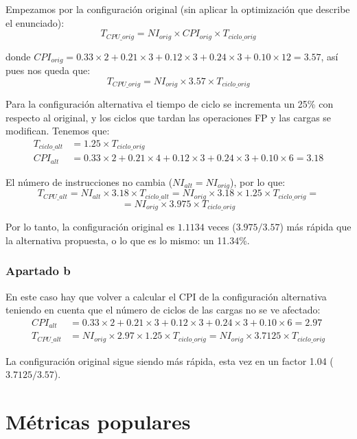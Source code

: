 \documentclass[12pt,onecolumn]{memoir}
\newenvironment{ejercicio}{%
    \def\FrameCommand{\fboxrule=\FrameRule\fboxsep=\FrameSep \fcolorbox{black}{metallic-green}}%
    \MakeFramed {\FrameRestore}}%
{\endMakeFramed}
\begin{document}
\begin{ejercicio}
Empezamos por la configuración original (sin aplicar la optimización que describe el enunciado):
\[ T_{CPU\_orig} = NI_{orig} \times CPI_{orig} \times T_{ciclo\_orig} \]

donde $CPI_{orig} = 0.33 \times 2 + 0.21 \times 3 + 0.12 \times 3 + 0.24 \times 3 + 0.10 \times 12 = 3.57$, así pues nos queda que:
\[ T_{CPU\_orig} = NI_{orig} \times 3.57 \times T_{ciclo\_orig} \]

Para la configuración alternativa el tiempo de ciclo se incrementa un 25\% con respecto al original, y los ciclos que tardan las operaciones FP y las cargas se modifican. Tenemos que:
\begin{align*}
  T_{ciclo\_alt} &= 1.25 \times T_{ciclo\_orig}\\
  CPI_{alt} &= 0.33 \times 2 + 0.21 \times 4 + 0.12 \times 3 + 0.24 \times 3 + 0.10 \times 6 = 3.18
\end{align*}

El número de instrucciones no cambia ($NI_{alt} = NI_{orig}$), por lo
que:
\[ T_{CPU\_alt} = NI_{alt} \times 3.18 \times T_{ciclo\_alt} =
NI_{orig} \times 3.18 \times 1.25 \times T_{ciclo\_orig} = \]
\[ = NI_{orig} \times 3.975 \times T_{ciclo\_orig} \]

Por lo tanto, la configuración original es $1.1134$ veces ($3.975 / 3.57$) más rápida que la alternativa propuesta, o lo que es lo mismo: un 11.34\%.

\subsubsection*{Apartado b}

En este caso hay que volver a calcular el CPI de la configuración alternativa teniendo en cuenta que el número de ciclos de las cargas no se ve afectado:
\begin{align*}
CPI_{alt} &= 0.33 \times 2 + 0.21 \times 3 + 0.12 \times 3 + 0.24 \times 3 + 0.10 \times 6 = 2.97 \\
T_{CPU\_alt} &= NI_{orig} \times 2.97 \times 1.25 \times T_{ciclo\_orig} = NI_{orig} \times 3.7125 \times T_{ciclo\_orig}
\end{align*}

La configuración original sigue siendo más rápida, esta vez en un factor 1.04 ($3.7125/3.57$).

\end{ejercicio}

\section{Métricas populares}
\end{document}
